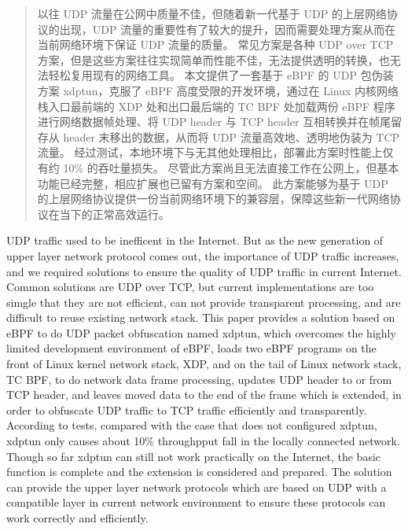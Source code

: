 


\begin{abstract}
  以往 UDP 流量在公网中质量不佳，但随着新一代基于 UDP 的上层网络协议的出现，UDP 流量的重要性有了较大的提升，因而需要处理方案从而在当前网络环境下保证 UDP 流量的质量。
  常见方案是各种 UDP over TCP 方案，但是这些方案往往实现简单而性能不佳，无法提供透明的转换，也无法轻松复用现有的网络工具。
  本文提供了一套基于 eBPF 的 UDP 包伪装方案 xdptun，克服了 eBPF 高度受限的开发环境，通过在 Linux 内核网络栈入口最前端的 XDP 处和出口最后端的 TC BPF 处加载两份 eBPF 程序进行网络数据帧处理、将 UDP header 与 TCP header 互相转换并在帧尾留存从 header 末移出的数据，从而将 UDP 流量高效地、透明地伪装为 TCP 流量。
  经过测试，本地环境下与无其他处理相比，部署此方案时性能上仅有约 10\% 的吞吐量损失。
  尽管此方案尚且无法直接工作在公网上，但基本功能已经完整，相应扩展也已留有方案和空间。
  此方案能够为基于 UDP 的上层网络协议提供一份当前网络环境下的兼容层，保障这些新一代网络协议在当下的正常高效运行。
\end{abstract}

\begin{abstract*}
  UDP traffic used to be inefficent in the Internet. But as the new generation of upper layer network protocol comes out, the importance of UDP traffic increases, and we required solutions to ensure the quality of UDP traffic in current Internet.
  Common solutions are UDP over TCP, but current implementations are too simgle that they are not efficient, can not provide transparent processing, and are difficult to reuse existing network stack.
  This paper provides a solution based on eBPF to do UDP packet obfuscation named xdptun, which overcomes the highly limited development environment of eBPF, loads two eBPF programs on the front of Linux kernel network stack, XDP, and on the tail of Linux network stack, TC BPF, to do network data frame processing, updates UDP header to or from TCP header, and leaves moved data to the end of the frame which is extended, in order to obfuscate UDP traffic to TCP traffic efficiently and transparently.
  According to tests, compared with the case that does not configured xdptun, xdptun only causes about 10\% throughpput fall in the locally connected network.
  Though so far xdptun can still not work practically on the Internet, the basic function is complete and the extension is considered and prepared.
  The solution can provide the upper layer network protocols which are based on UDP with a compatible layer in current network environment to ensure these protocols can work correctly and efficiently.
\end{abstract*}
